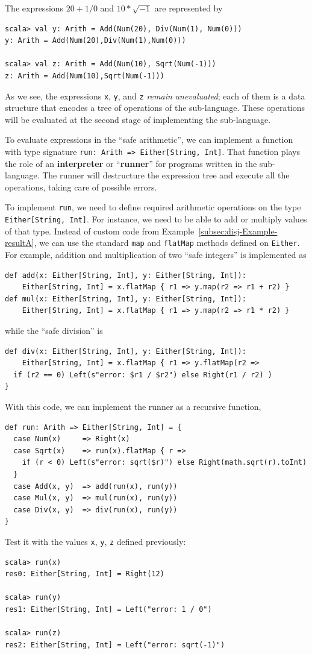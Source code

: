 The expressions $20+1/0$ and $10*\sqrt{-1}$ are represented by
\begin{lstlisting}
scala> val y: Arith = Add(Num(20), Div(Num(1), Num(0)))
y: Arith = Add(Num(20),Div(Num(1),Num(0)))

scala> val z: Arith = Add(Num(10), Sqrt(Num(-1)))
z: Arith = Add(Num(10),Sqrt(Num(-1)))
\end{lstlisting}
As we see, the expressions \lstinline!x!, \lstinline!y!, and \lstinline!z!
\emph{remain} \emph{unevaluated}; each of them is a data structure
that encodes a tree of operations of the sub-language. These operations
will be evaluated at the second stage of implementing the sub-language.

To evaluate expressions in the ``safe arithmetic'', we can implement
a function with type signature \lstinline!run: Arith => Either[String, Int]!.
That function plays the role of an \textbf{interpreter}
or ``\textbf{runner}'' for programs written in the
sub-language. The runner will destructure the expression tree and
execute all the operations, taking care of possible errors. 

To implement \lstinline!run!, we need to define required arithmetic
operations on the type \lstinline!Either[String, Int]!. For instance,
we need to be able to add or multiply values of that type. Instead
of custom code from Example~\ref{subsec:disj-Example-resultA}, we
can use the standard \lstinline!map! and \lstinline!flatMap! methods
defined on \lstinline!Either!. For example, addition and multiplication
of two ``safe integers'' is implemented as 
\begin{lstlisting}
def add(x: Either[String, Int], y: Either[String, Int]):
    Either[String, Int] = x.flatMap { r1 => y.map(r2 => r1 + r2) }
def mul(x: Either[String, Int], y: Either[String, Int]):
    Either[String, Int] = x.flatMap { r1 => y.map(r2 => r1 * r2) }
\end{lstlisting}
while the ``safe division'' is
\begin{lstlisting}
def div(x: Either[String, Int], y: Either[String, Int]):
    Either[String, Int] = x.flatMap { r1 => y.flatMap(r2 =>
  if (r2 == 0) Left(s"error: $r1 / $r2") else Right(r1 / r2) )
}
\end{lstlisting}
With this code, we can implement the runner as a recursive function,
\begin{lstlisting}
def run: Arith => Either[String, Int] = {
  case Num(x)     => Right(x)
  case Sqrt(x)    => run(x).flatMap { r =>
    if (r < 0) Left(s"error: sqrt($r)") else Right(math.sqrt(r).toInt)
  }
  case Add(x, y)  => add(run(x), run(y))
  case Mul(x, y)  => mul(run(x), run(y))
  case Div(x, y)  => div(run(x), run(y))
}
\end{lstlisting}
Test it with the values \lstinline!x!, \lstinline!y!, \lstinline!z!
defined previously:
\begin{lstlisting}
scala> run(x)
res0: Either[String, Int] = Right(12)

scala> run(y)
res1: Either[String, Int] = Left("error: 1 / 0")

scala> run(z)
res2: Either[String, Int] = Left("error: sqrt(-1)")
\end{lstlisting}


